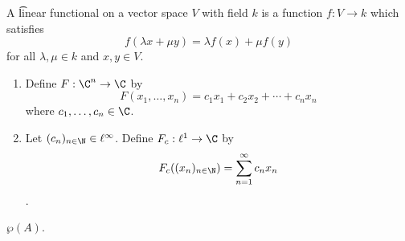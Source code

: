 


A \t{linear functional} on a vector space $V$ with field $k$ is a function $f: V \to k$ which satisfies \[f(\lambda x + \mu y) = \lambda f(x) + \mu f(y)\] for all $\lambda, \mu \in k$ and $x, y \in V$.


\begin{enumerate}
	\item Define $F: \C^n \to \C$ by \[ F(x_1, \dots, x_n) = c_1x_1 + c_2x_2 + \cdots + c_nx_n \] where $c_1, \dots, c_n \in \C$.
	\item Let $(c_n)_{n \in \N} \in \ell^{\infty}$. Define $F_c: \ell^1 \to \C$ by \[ F_c((x_n)_{n \in \N}) = \sum_{n = 1}^{\infty} c_n x_n\].
\end{enumerate}

$\wp(A)$.


\blankpage
